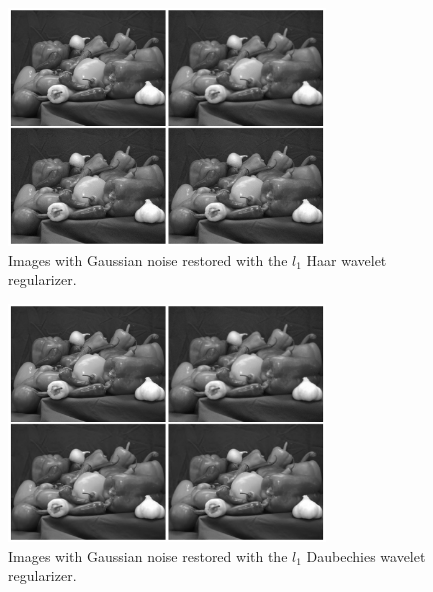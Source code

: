 \documentclass[10pt,a4paper]{article}
\begin{document}
	\begin{figure}[H]
		\begin{center}
			\includegraphics[width = 0.75\textwidth]{../figures/waveletGaussH.pdf} 
		\end{center}
		\caption{Images with Gaussian noise restored with the $l_1$ Haar wavelet regularizer.}
		\label{waveletH_gauss}
	\end{figure}
	
	\begin{figure}[H]
		\begin{center}
			\includegraphics[width = 0.75\textwidth]{../figures/waveletGaussD.pdf} 
		\end{center}
		\caption{Images with Gaussian noise restored with the $l_1$ Daubechies wavelet regularizer.}
		\label{waveletD_gauss}
	\end{figure}
	
\end{document}
